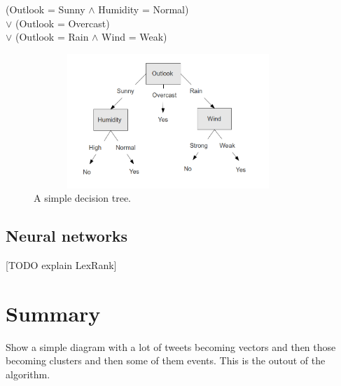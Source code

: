 \begin{center}
  (Outlook = Sunny $\wedge$ Humidity = Normal)\\
  $\vee$ (Outlook = Overcast)\\
  $\vee$ (Outlook = Rain $\wedge$ Wind = Weak)
\end{center}

\begin{figure}[!htbp]
  \begin{center}
    \includegraphics[height=2in, width=4in]{decision-tree-example}
    \caption{A simple decision tree.}
    \label{DecisionTreeExample}
  \end{center}
\end{figure} 

\subsection{Neural networks}
[TODO explain LexRank]

\section{Summary}

Show a simple diagram with a lot of tweets becoming vectors and then those becoming clusters and then some of them events.
This is the outout of the algorithm.


